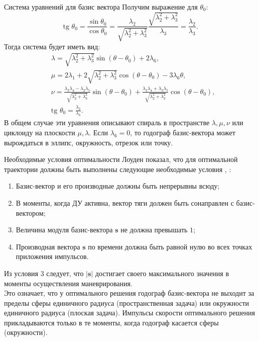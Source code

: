 \documentclass[9pt]{beamer}
\begin{document}
\begin{frame}{Система уравнений для базис вектора}
Получим выражение для $\theta_0$:
\begin{equation*}
    \text{tg } \theta_0 = \frac{\sin \theta_0}{\cos \theta_0} = \frac{\lambda_2}{\sqrt{\lambda_2^2 + \lambda_3^2}} \frac{\sqrt{\lambda_2^2 + \lambda_3^2}}{\lambda_3} = \frac{\lambda_2}{\lambda_3}.
\end{equation*}
Тогда система будет иметь вид:
\begin{equation*}
    \boxed{
    \begin{aligned}
        &\lambda = \sqrt{\lambda_2^2 + \lambda_3^2} \sin (\theta - \theta_0) + 2 \lambda_6, \\
        &\mu = 2 \lambda_1 + 2 \sqrt{\lambda_2^2 + \lambda_3^2} \cos (\theta - \theta_0) - 3 \lambda_6 \theta, \\
        &\nu = \frac{\lambda_3 \lambda_4 - \lambda_2 \lambda_5}{\sqrt{\lambda_2^2 + \lambda_3^2}} \sin (\theta - \theta_0) + \frac{\lambda_2 \lambda_4 + \lambda_3 \lambda_5}{\sqrt{\lambda_2^2 + \lambda_3^2}} \cos (\theta - \theta_0), \\
        &\text{tg } \theta_0 = \frac{\lambda_2}{\lambda_3}. 
    \end{aligned}
    }
\end{equation*}
В общем случае эти уравнения описывают спираль в пространстве $\lambda, \mu, \nu$ или циклоиду на плоскости $\mu, \lambda$. Если $\lambda_6 = 0$, то годограф базис-вектора может вырождаться в эллипс, окружность, отрезок или точку. 
\end{frame}

\begin{frame}{Необходимые условия оптимальности}
Лоуден показал, что для оптимальной траектории должны быть выполнены следующие необходимые условия \cite{Lawden_all}, \cite{Edelbaum_1}:
\begin{enumerate}
    \item Базис-вектор и его производные должны быть непрерывны всюду;
    \item В моменты, когда ДУ активна, вектор тяги должен быть сонаправлен с базис-вектором;
    \item Величина модуля базис-вектора $\mathbf{s}$ не должна превышать $1$;
    \item Производная вектора $\mathbf{s}$ по времени должна быть равной нулю во всех точках приложения импульсов.
\end{enumerate}
Из условия 3 следует, что $|\mathbf{s}|$ достигает своего максимального значения в моменты осуществления маневрирования. \\
Это означает, что у оптимального решения годограф базис-вектора не выходит за пределы сферы единичного радиуса (пространственная задача) или окружности единичного радиуса (плоская задача). Импульсы скорости оптимального решения прикладываются только в те моменты, когда годограф касается сферы (окружности).
\end{frame}
\end{document}
